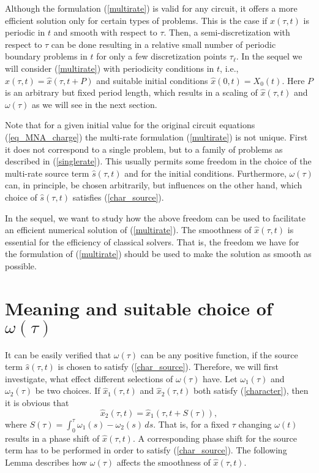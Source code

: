 \documentclass{siamltex}
\begin{document}
Although the formulation (\ref{multirate}) is valid for any circuit,
it offers a more efficient solution only for certain types of
problems. This is the case if $\hat{x}(\tau,t)$ is periodic in $t$
and smooth with respect to $\tau$. Then, a semi-discretization with
respect to $\tau$ can be done resulting in a relative small number of
 periodic boundary problems
in $t$ for only a few discretization points $\tau_\ell$.
In the sequel we
will consider (\ref{multirate}) with periodicity conditions in
$t$, i.e., $\hat{x}(\tau,t)=\hat{x}(\tau,t+P)$ and suitable
initial conditions $\hat{x}(0,t)=X_0(t)$.
Here $P$ is an arbitrary but fixed period length, which results in a scaling of 
$\hat{x}(\tau,t)$ and $\omega(\tau)$
as we will see in the next section.

Note that for a given initial value for the original circuit equations
(\ref{eq_MNA_charge}) the
multi-rate formulation (\ref{multirate}) is not unique. First it does not
correspond to a single problem, but to a family of problems as
described in (\ref{singlerate}). This usually permits some freedom
in the choice of the multi-rate source term $\hat{s}(\tau,t)$ and for the initial
conditions. Furthermore, $\omega(\tau)$ can, in principle,
be chosen arbitrarily, but influences on the other hand, which choice 
of $\hat{s}(\tau,t)$ satisfies (\ref{char_source}).

In the sequel, we want to study how the above freedom can be used to
facilitate an efficient numerical solution of (\ref{multirate}). The
smoothness of $\hat{x}(\tau,t)$ is essential for the efficiency of
classical solvers. That is, the freedom we have for the formulation
of (\ref{multirate}) should be used to make the solution as smooth
as possible.

\section{Meaning and suitable choice of $\omega(\tau)$\label{OMEGA}}

It can be easily verified that $\omega(\tau)$ can be any positive function, if the source term
$\hat{s}(\tau,t)$ is chosen to satisfy (\ref{char_source}). 
Therefore, we will
first investigate, what effect different selections of
$\omega(\tau)$ have. Let $\omega_1(\tau)$ and $\omega_2(\tau)$ be two 
choices. If $\hat{x}_1(\tau,t)$ and $\hat{x}_2(\tau,t)$ both satisfy
(\ref{character}), then it is obvious that
\begin{equation}\label{omega2}
\hat{x}_2(\tau,t)=\hat{x}_1(\tau,t+S(\tau)),
\end{equation}
where $S(\tau) =\int_0^\tau \omega_1(s)-\omega_2(s)\,ds$. That is, for a
fixed $\tau$ changing $\omega(t)$ results in a phase shift of
$\hat{x}(\tau,t)$. A corresponding phase shift for the source term
has to be performed in order to satisfy (\ref{char_source}). 
The following Lemma describes how $\omega(\tau)$ affects the smoothness of 
$\hat{x}(\tau,t)$.
\end{document}
